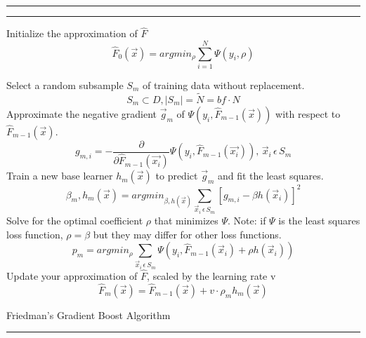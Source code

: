 \documentclass[runningheads]{llncs}
\begin{document}
\newpage
\begin{algorithm}[H]
	\rule{\textwidth}{2pt}
	
	\rule{\textwidth}{.5pt}
	Initialize the  approximation of \(\hat{F}\)
	\begin{equation}
	 \hat{F}_0(\vec{x}) = argmin_\rho \sum_{i=1}^{N}\Psi(y_i, \rho) 
	\end{equation}
	{
		Select a random subsample \(S_m\) of training data without replacement.
		\begin{equation}
		S_m \subset D,  |S_m| = \tilde{N} = bf  \cdot  N 
		\end{equation}
		Approximate the negative gradient \(\vec{g}_m\) of \(\Psi(y_i, \hat{F}_{m-1} (\vec{x}) ) \) with respect to \(\hat{F}_{m-1} (\vec{x})\).
		\begin{equation}
		g_{m,i} = -\frac{\partial}{\partial \hat{F}_{m-1}(\vec{x_i})} \Psi(y_i, \hat{F}_{m-1}(\vec{x_i})), \, \vec{x}_i \, \epsilon \, S_m
		\label{eq:NegativeGradient}
		\end{equation}
		Train a new base learner \(h_m(\vec{x})\) to predict \(\vec{g}_m\) and fit the least squares.
		\begin{equation}
		\beta_m, h_m(\vec{x}) = argmin_{\beta, h(\vec{x})}\sum_{\vec{x}_i \, \epsilon \, S_m}[ g_{m,i} - \beta h(\vec{x}_i)]^2
		\label{eq:NewBaseLearner}
		\end{equation}		
		Solve for the optimal coefficient \(\rho\) that minimizes \(\Psi\). Note: if \(\Psi\) is the least squares loss function, \(\rho = \beta \) but they may differ for other loss functions.
		\begin{equation}
		p_m = argmin_\rho \sum_{\vec{x}_i \, \epsilon \, S_m}\Psi(y_i, \hat{F}_{m-1}(\vec{x}_i) + \rho h(\vec{x}_i))
		\label{eq:ScalingCoefficent}
		\end{equation}
		Update your approximation of \(\hat{F}\), scaled by the learning rate v
		\begin{equation}
		\hat{F}_m(\vec{x}) = \hat{F}_{m-1}(\vec{x}) + v  \cdot  \rho_m h_m(\vec{x})
		\label{eq:UpdateStep}
		\end{equation}
		
	}
	\caption{Friedman's Gradient Boost Algorithm  \cite{2001Friedman} \cite{GBMTut} \cite{2002Friedman} \cite{death2007ABT}}
	\rule{\textwidth}{2pt}
	\label{alg:GeneralGradientBoost}
\end{algorithm}
\end{document}

